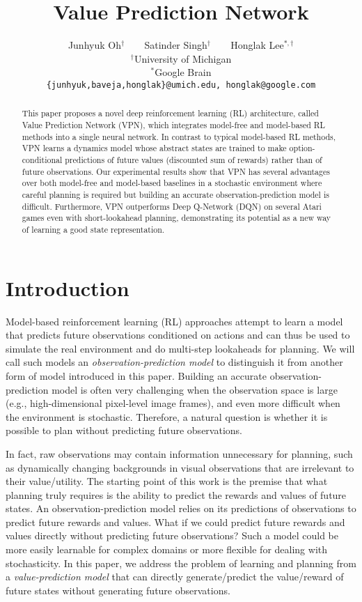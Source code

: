 \documentclass{article}
\title{Value Prediction Network}
\author{
  Junhyuk Oh$^\dagger$ \texttt{  } \texttt{  } 
  Satinder Singh$^\dagger$ \texttt{  } \texttt{  }
  Honglak Lee$^{*,\dagger}$ \\
  $^\dagger$University of Michigan \\ $^*$Google Brain \\
\texttt{\{junhyuk,baveja,honglak\}@umich.edu, honglak@google.com}
}
\newcommand{\obsmodel}{{observation-prediction model}}
\newcommand{\valuemodel}{{value-prediction model}}
\newcommand{\cutabstractup}{\vspace*{-0.05in}}
\newcommand{\cutabstractdown}{\vspace*{-0.08in}}
\newcommand{\cutsectionup}{\vspace*{-0.05in}}
\newcommand{\cutsectiondown}{\vspace*{-0.03in}}
\begin{document}
\maketitle
\cutabstractup
\begin{abstract}
\vspace*{-0.1in}
This paper proposes a novel deep reinforcement learning (RL) architecture, called Value Prediction Network (VPN), which integrates model-free and model-based RL methods into a single neural network. In contrast to typical model-based RL methods, VPN learns a dynamics model whose abstract states are trained to make option-conditional predictions of future values (discounted sum of rewards) rather than of future observations. Our experimental results show that VPN has several advantages over both model-free and model-based baselines in a stochastic environment where careful planning is required but building an accurate observation-prediction model is difficult. Furthermore, VPN outperforms Deep Q-Network (DQN) on several Atari games even with short-lookahead planning, demonstrating its potential as a new way of learning a good state representation.
\end{abstract}
\cutabstractdown

\cutsectionup
\section{Introduction}
\cutsectiondown

Model-based reinforcement learning (RL) approaches attempt to learn a model that predicts future observations conditioned on actions and can thus be used to simulate the real environment and do multi-step lookaheads for planning. We will call such models an \textit{\obsmodel{}} to distinguish it from another form of model introduced in this paper. Building an accurate \obsmodel{} is often very challenging when the observation space is large~\citep{oh2015action,Finn2016UnsupervisedLF,Kalchbrenner2016VideoPN,Chiappa2017RecurrentES} (e.g., high-dimensional pixel-level image frames), and even more difficult when the environment is stochastic. 
Therefore, a natural question is whether it is possible to plan without predicting future observations. 

In fact, raw observations may contain information unnecessary for planning, such as dynamically changing backgrounds in visual observations that are irrelevant to their value/utility. The starting point of this work is the premise that what planning truly requires is the ability to predict the rewards and values of future states.
An \obsmodel{} relies on its predictions of observations to predict future rewards and values. 
What if we could predict future rewards and values directly without predicting future observations? Such a model could be more easily learnable for complex domains or more flexible for dealing with stochasticity. In this paper, we address the problem of learning and planning from a \textit{\valuemodel{}} that can directly generate/predict the value/reward of future states without generating future observations.
\end{document}
